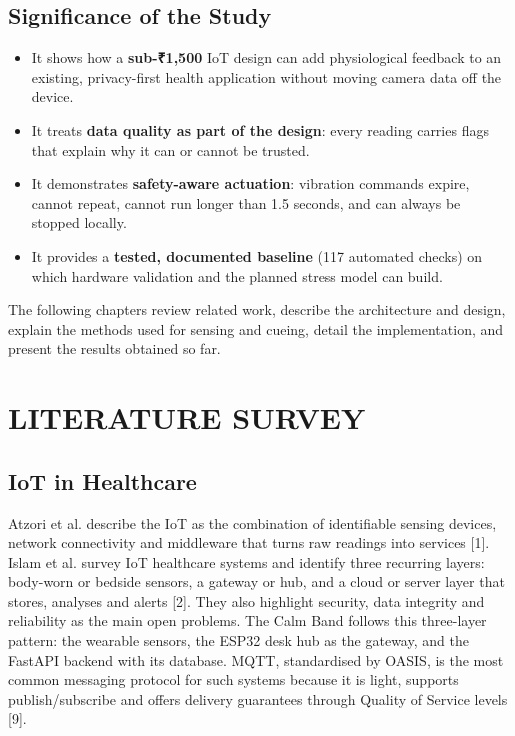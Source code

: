 \documentclass[12pt,letterpaper,oneside]{report}
\begin{document}
\section{Significance of the Study}\label{sec:1.6}

\begin{itemize}\item It shows how a \textbf{sub-₹1,500} IoT design can add physiological feedback to an existing, privacy-first health application without moving camera data off the device.
\item It treats \textbf{data quality as part of the design}: every reading carries flags that explain why it can or cannot be trusted.
\item It demonstrates \textbf{safety-aware actuation}: vibration commands expire, cannot repeat, cannot run longer than 1.5 seconds, and can always be stopped locally.
\item It provides a \textbf{tested, documented baseline} (117 automated checks) on which hardware validation and the planned stress model can build.
\end{itemize}

The following chapters review related work, describe the architecture and design, explain the methods used for sensing and cueing, detail the implementation, and present the results obtained so far.


\chapter{LITERATURE SURVEY}\label{ch:2}

\section{IoT in Healthcare}\label{sec:2.1}

Atzori et al. describe the IoT as the combination of identifiable sensing devices, network connectivity and middleware that turns raw readings into services [1]. Islam et al. survey IoT healthcare systems and identify three recurring layers: body-worn or bedside sensors, a gateway or hub, and a cloud or server layer that stores, analyses and alerts [2]. They also highlight security, data integrity and reliability as the main open problems. The Calm Band follows this three-layer pattern: the wearable sensors, the ESP32 desk hub as the gateway, and the FastAPI backend with its database. MQTT, standardised by OASIS, is the most common messaging protocol for such systems because it is light, supports publish/subscribe and offers delivery guarantees through Quality of Service levels [9].
\end{document}
